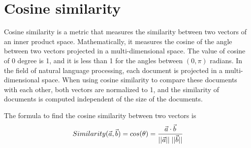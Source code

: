 \section{Cosine similarity}

Cosine similarity is a metric that measures the similarity between two vectors of an inner product space. Mathematically, it measures the cosine of the angle between two vectors projected in a multi-dimensional space. The value of cosine of 0 degree is 1, and it is less than 1 for the angles between $(0,\pi)$ radians. In the field of natural language processing, each document is projected in a multi-dimensional space. When using cosine similarity to compare these documents with each other, both vectors are normalized to 1, and the similarity of documents is computed independent of the size of the documents\cite{IJSRSET}.

The formula to find the cosine similarity between two vectors is
\begin{align}
    Similarity(\vec{a},\vec{b}) = cos(\theta)=\frac{\vec{a}\cdot \vec{b}}{||\vec{a}||\hspace{0.1cm}||\vec{b}||}
\end{align}
